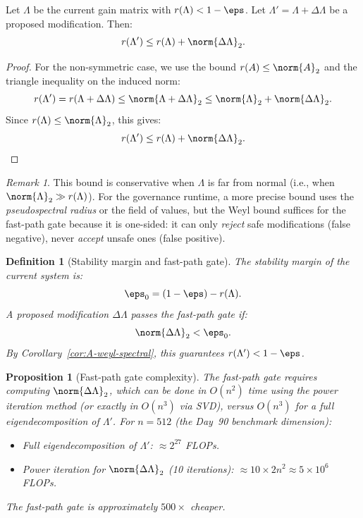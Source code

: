 \documentclass[11pt,letterpaper]{article}
\theoremstyle{pirtmthm}
\newtheorem{definition}{Definition}[section]
\newtheorem{proposition}{Proposition}[section]
\theoremstyle{remark}
\newtheorem{remark}{Remark}[section]
\begin{document}
\begin{corollary}
\label{cor:A-weyl-spectral}
Let $\Lambda$ be the current gain matrix with $r(\Lambda) < 1 - \eps$.
Let $\Lambda' = \Lambda + \Delta\Lambda$ be a proposed modification.
Then:
\[
  r(\Lambda') \leq r(\Lambda) + \norm{\Delta\Lambda}_2.
\]
\end{corollary}

\begin{proof}
For the non-symmetric case, we use the bound $r(A) \leq \norm{A}_2$
and the triangle inequality on the induced norm:
\[
  r(\Lambda') = r(\Lambda + \Delta\Lambda) \leq \norm{\Lambda + \Delta\Lambda}_2
  \leq \norm{\Lambda}_2 + \norm{\Delta\Lambda}_2.
\]
Since $r(\Lambda) \leq \norm{\Lambda}_2$, this gives:
\[
  r(\Lambda') \leq r(\Lambda) + \norm{\Delta\Lambda}_2.
\]
\end{proof}

\begin{remark}
This bound is conservative when $\Lambda$ is far from normal
(i.e., when $\norm{\Lambda}_2 \gg r(\Lambda)$). For the governance
runtime, a more precise bound uses the \emph{pseudospectral radius}
or the field of values, but the Weyl bound suffices for the fast-path
gate because it is one-sided: it can only \emph{reject} safe modifications
(false negative), never \emph{accept} unsafe ones (false positive).
\end{remark}

\begin{definition}[Stability margin and fast-path gate]
\label{def:stability-margin}
The \emph{stability margin} of the current system is:
\[
  \eps_0 = (1 - \eps) - r(\Lambda).
\]
A proposed modification $\Delta\Lambda$ \emph{passes the fast-path gate}
if:
\[
  \norm{\Delta\Lambda}_2 < \eps_0.
\]
By Corollary~\ref{cor:A-weyl-spectral}, this guarantees $r(\Lambda') < 1 - \eps$.
\end{definition}

\begin{proposition}[Fast-path gate complexity]
\label{prop:fast-path-complexity}
The fast-path gate requires computing $\norm{\Delta\Lambda}_2$,
which can be done in $O(n^2)$ time using the power iteration method
(or exactly in $O(n^3)$ via SVD), versus $O(n^3)$ for a full eigendecomposition
of $\Lambda'$. For $n = 512$ (the Day~90 benchmark dimension):
\begin{itemize}
  \item Full eigendecomposition of $\Lambda'$: $\approx 2^{27}$ FLOPs.
  \item Power iteration for $\norm{\Delta\Lambda}_2$ (10 iterations):
    $\approx 10 \times 2n^2 \approx 5 \times 10^6$ FLOPs.
\end{itemize}
The fast-path gate is approximately $500\times$ cheaper.
\end{proposition}
\end{document}
